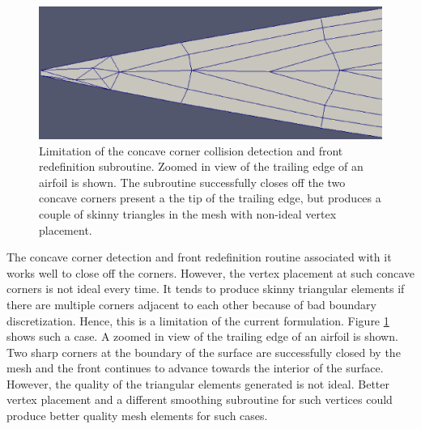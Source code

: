 \documentclass[conf]{new-aiaa}
\begin{document}
\begin{figure}
\centering
\includegraphics[width=0.4\linewidth]{cornerCollision/cornerLimitation.eps}
\caption{Limitation of the concave corner collision detection and front redefinition subroutine. Zoomed in view of the trailing edge of an airfoil is shown. The subroutine successfully closes off the two concave corners present a the tip of the trailing edge, but produces a couple of skinny triangles in the mesh with non-ideal vertex placement.}
\label{fig-cornerLimitation}
\end{figure}

The concave corner detection and front redefinition routine associated with it works well to close off the corners. However, the vertex placement at such concave corners is not ideal every time. It tends to produce skinny triangular elements if there are multiple corners adjacent to each other because of bad boundary discretization. Hence, this is a limitation of the current formulation. Figure \ref{fig-cornerLimitation} shows such a case. A zoomed in view of the trailing edge of an airfoil is shown. Two sharp corners at the boundary of the surface are successfully closed by the mesh and the front continues to advance towards the interior of the surface. However, the quality of the triangular elements generated is not ideal. Better vertex placement and a different smoothing subroutine for such vertices could produce better quality mesh elements for such cases.



\end{document}

